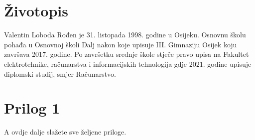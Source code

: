 \documentclass[a4paper,12pt,oneside]{article}
\begin{document}
\newpage
\section*{Životopis}

Valentin Loboda Rođen je 31. listopada 1998. godine u Osijeku. Osnovnu školu pohađa u 
Osnovnoj školi Dalj nakon koje upisuje III. Gimnaziju Osijek koju završava 2017. godine. Po 
završetku srednje škole stječe pravo upisa na Fakultet elektrotehnike, računarstva i informacijskih 
tehnologija gdje 2021. godine upisuje diplomski studij, smjer Računarstvo.



\newpage
\section*{Prilog 1}


A ovdje dalje sla\v{z}ete sve \v{z}eljene priloge.
\end{document}

